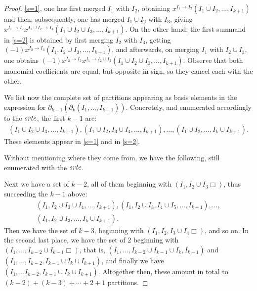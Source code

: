 \documentclass[10pt]{amsart}
\newcommand{\dif}{\mbox{$\partial$}}
\newcommand{\srle}{\mbox{${\rm srle}$}}
\theoremstyle{definition}
\theoremstyle{remark}
\begin{document}
\begin{proof}
\eqref{s=1}, one has first merged $I_1$ with $I_2$, obtaining
$x^{I_1\to I_2}(I_1\cup I_2,\ldots ,I_{k+1})$ and then, subsequently,
one has merged $I_1\cup I_2$ with $I_3$, giving $x^{I_1\to
  I_2}x^{I_1\cup I_2\to I_3}(I_1\cup I_2\cup I_3,\ldots ,I_{k+1})$. On
the other hand, the first summand in \eqref{s=2} is obtained by first
merging $I_2$ with $I_3$, getting $(-1)x^{I_2\to I_3}(I_1,I_2\cup
I_3,\ldots ,I_{k+1})$, and afterwards, on merging $I_1$ with $I_2\cup
I_3$, one obtains $(-1)x^{I_2\to I_3}x^{I_1\to I_2\cup I_3}(I_1\cup
I_2\cup I_3,\ldots ,I_{k+1})$. Observe that both monomial coefficients
are equal, but opposite in sign, so they cancel each with the other.

We list now the complete set of partitions appearing as basis elements
in the expression for
$\dif_{k-1}(\dif_{k}(I_1,\ldots,I_{k+1}))$. Concretely, and enumerated
accordingly to the $\srle$, the first $k-1$ are:
\begin{eqnarray*}
(I_1\cup I_2\cup I_3,\ldots ,I_{k+1}),(I_1\cup I_2,I_3\cup I_4,\ldots
  ,I_{k+1}),\ldots ,(I_1\cup I_2,\ldots , I_k\cup I_{k+1}).
\end{eqnarray*}
These elements appear in \eqref{s=1} and in \eqref{s=2}. 

Without mentioning where they come from, we have the following, still
enumerated with the $\srle$.

Next we have a set of $k-2$, all of them beginning with $(I_1,I_2\cup
I_3\Box)$, thus succeeding the $k-1$ above:
\begin{multline*}
(I_1,I_2\cup I_3\cup I_4,\ldots ,I_{k+1}), (I_1,I_2\cup I_3, I_4\cup
  I_5,\ldots ,I_{k+1}),\ldots ,\\ (I_1,I_2\cup I_3,\ldots ,I_k\cup I_{k+1}).
\end{multline*}
Then we have the set of $k-3$, beginning with $(I_1,I_2,I_3\cup
I_4\Box)$, and so on. In the second last place, we have the set of $2$
beginning with $(I_1,\ldots ,I_{k-2}\cup I_{k-1}\Box)$, that is,
$(I_1,\ldots ,I_{k-2}\cup I_{k-1}\cup I_{k},I_{k+1})$ and $(I_1,\ldots
,I_{k-2},I_{k-1}\cup I_{k}\cup I_{k+1})$, and finally we have $(I_1,\ldots
I_{k-2}, I_{k-1}\cup I_{k}\cup I_{k+1})$. Altogether then, these
amount in total to $(k-2)+(k-3)+\cdots +2+1$ partitions.


\end{proof}
\end{document}
